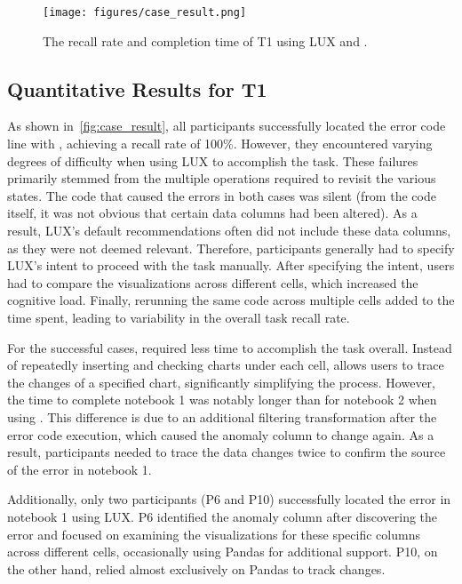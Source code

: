\begin{figure}[!htb]
    \centering
    \texttt{[image: figures/case\_result.png]}
    \caption{The recall rate and completion time of T1 using LUX and \system{}.}
    \label{fig:case_result}
\end{figure}

\subsection{Quantitative Results for T1}

As shown in~\autoref{fig:case_result}, all participants successfully located the error code line with \system{}, achieving a recall rate of 100\%. 
However, they encountered varying degrees of difficulty when using LUX to accomplish the task. 
These failures primarily stemmed from the multiple operations required to revisit the various states. 
The code that caused the errors in both cases was silent (from the code itself, it was not obvious that certain data columns had been altered). 
As a result, LUX's default recommendations often did not include these data columns, as they were not deemed relevant. 
Therefore, participants generally had to specify LUX's intent to proceed with the task manually. After specifying the intent, users had to compare the visualizations across different cells, which increased the cognitive load. Finally, rerunning the same code across multiple cells added to the time spent, leading to variability in the overall task recall rate.

For the successful cases, \system{} required less time to accomplish the task overall. Instead of repeatedly inserting and checking charts under each cell, \system{} allows users to trace the changes of a specified chart, significantly simplifying the process. However, the time to complete notebook 1 was notably longer than for notebook 2 when using \system{}. This difference is due to an additional filtering transformation after the error code execution, which caused the anomaly column to change again. As a result, participants needed to trace the data changes twice to confirm the source of the error in notebook 1.

Additionally, only two participants (P6 and P10) successfully located the error in notebook 1 using LUX. P6 identified the anomaly column after discovering the error and focused on examining the visualizations for these specific columns across different cells, occasionally using Pandas for additional support. P10, on the other hand, relied almost exclusively on Pandas to track changes.


